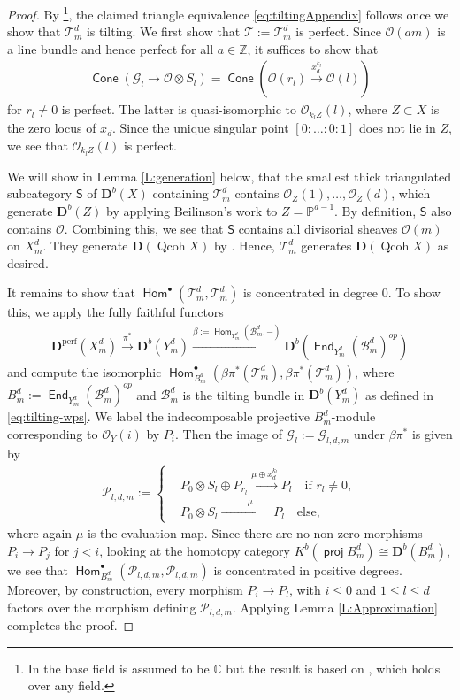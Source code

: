 \documentclass[a4paper,11pt, reqno]{amsart}
\def\C{\mathbb C}
\def\P{\mathbb P}
\def\Z{\mathbb Z}
\def\DD{\mathbf D}
\def\OO{\mathcal O}
\def\sB{\mathscr{B}}
\def\sG{\mathscr{G}}
\def\sP{\mathscr{P}}
\def\sT{\mathscr{T}}
\def\Qcoh{{\operatorname{Qcoh}}}
\newcommand{\opname}[1]{\operatorname{\mathsf{#1}}}
\newcommand{\Hom}{\opname{Hom}}
\newcommand{\End}{\opname{End}}
\newcommand{\Cone}{\opname{Cone}}
\newcommand{\op}{^{op}}
\def\Db{\DD^b}
\def\Perf{\DD^{\mathrm{perf}}}
\newcommand{\proj}{\opname{proj}\nolimits}
\theoremstyle{plain}
\theoremstyle{definition}
\numberwithin{equation}{section}
\newlength{\arrow}
\begin{document}
\begin{proof}
By \cite[Theorem 7.6]{hille-van-den-bergh}\footnote{In \cite{hille-van-den-bergh} the base field is assumed to be $\C$ but the result is based on \cite{BondalVdB}, which holds over any field.}, the claimed triangle equivalence \eqref{eq:tiltingAppendix} follows once we show that $\sT_m^d$ is tilting.  
We first show that $\sT :=\sT_m^d$ is perfect. Since $\OO(am)$ is a line bundle and hence perfect for all $a \in \Z$, it suffices to show that 
\begin{align}\label{E:Cone}
\Cone(\sG_l \to  \OO\otimes S_l) = \Cone(\OO(r_l) \xrightarrow{x_d^{k_l}} \OO(l) )
\end{align}
for $r_l \neq 0$ is perfect. 
The latter is quasi-isomorphic to $\OO_{k_lZ}(l)$, where $Z \subset X$ is the zero locus of $x_d$. 
Since the unique singular point $[ 0:\ldots:0:1 ]$ does not lie in $Z$, we see that $\OO_{k_lZ}(l)$ is perfect.

We will show in Lemma \ref{L:generation} below, that the smallest thick triangulated subcategory $\mathsf{S}$ of $\Db(X)$ containing $\sT_m^d$
contains $\OO_Z(1), \ldots, \OO_Z(d)$, which generate $\Db(Z)$ by applying Beilinson's work to $Z=\P^{d-1}$. 
By definition, $\mathsf{S}$ also contains $\OO$.
Combining this,  we see that $\mathsf{S}$ contains all divisorial sheaves $\OO(m)$ on $X^d_m$. They generate $\DD(\Qcoh X)$ by \cite[Lemma 36.16.1.] {stacks-project}. Hence, $\sT_m^d$ generates $\DD(\Qcoh X)$ as desired.

It remains to show that $\Hom^\bullet (\sT_m^d , \sT_m^d )$ is concentrated in degree $0$. To show this, we apply the fully faithful functors
\begin{align}
\Perf(X_m^d) \xrightarrow{\pi^*} \Db(Y_m^d ) \xrightarrow{\beta:=\Hom_{Y_m^d}(\sB_m^d , -)}  \Db(\End_{Y_m^d}(\sB_m^d )\op) 
\end{align}
and compute the isomorphic $\Hom^\bullet_{B_m^d}(\beta\pi^*(\sT_m^d), \beta\pi^*(\sT_m^d ))$, where $B_m^d :=\End_{Y_m^d}(\sB_m^d )\op$ and $\sB_m^d$ is the tilting bundle in $\Db (Y_m^d)$ as defined in \eqref{eq:tilting-wps}.
We label the indecomposable projective $B_m^d$-module corresponding to $\OO_Y(i)$ by $P_i$. Then the image of $\sG_l:=\sG_{l,d,m}$ under $\beta\pi^*$ is given by
\begin{align}
\sP_{l,d,m}:=\begin{cases} &P_0 \otimes S_l \oplus P_{r_l} \xrightarrow{\displaystyle \mu \oplus x_d^{k_l}} P_l \quad \text{if } r_l \neq 0,  \\ &P_0 \otimes S_l  \xrightarrow{\displaystyle \qquad \quad \mu    \qquad} P_l \quad \text{else, }\end{cases}
\end{align}
where again $\mu$ is the evaluation map.
Since there are no non-zero morphisms $P_i \to P_j$ for $j<i$, looking at the homotopy category $K^b(\proj B_m^d ) \cong \Db(B_m^d)$, we see that $\Hom^\bullet_{B_m^d}(\sP_{l,d,m}, \sP_{l,d,m})$ is concentrated in positive degrees.
Moreover, by construction, every morphism $P_i \to P_l$, with $i\leq 0$ and $1 \leq l \leq d$ factors over the morphism defining
$\sP_{l,d,m}$. Applying Lemma \ref{L:Approximation} completes the proof. 


\end{proof}
\end{document}
